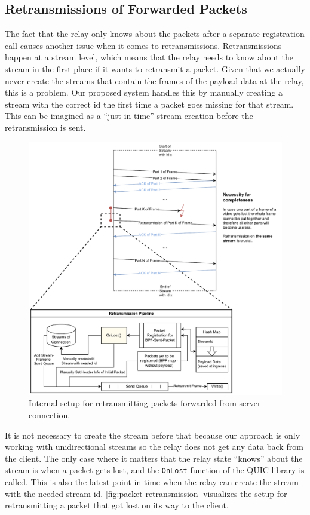 \subsection{Retransmissions of Forwarded Packets}
The fact that the relay only knows about the packets after a separate registration call causes 
another issue when it comes to retransmissions.
Retransmissions happen at a stream level, which means that the relay needs to know about the 
stream in the first place if it wants to retransmit a packet.
Given that we actually never create the streams that contain the frames of the payload data 
at the relay, this is a problem.
Our proposed system handles this by manually creating a stream with the correct id the first
time a packet goes missing for that stream.
This can be imagined as a ``just-in-time'' stream creation before the retransmission is sent.

\begin{figure}[H]
    \centering
    \includegraphics[width=\textwidth]{figures/03_fast_relays/retransmission.drawio.pdf}
    \caption[Packet retransmission schematic]{Internal setup for retransmitting packets forwarded from server connection.}\label{fig:packet-retransmission}
\end{figure}

\noindent
It is not necessary to create the stream before that because our approach is only working with 
unidirectional streams so the relay does not get any data back from the client.
The only case where it matters that the relay state ``knows'' about the stream is when a packet
gets lost, and the \verb|OnLost| function of the QUIC library is called.
This is also the latest point in time when the relay can create the stream with the needed stream-id.
\autoref{fig:packet-retransmission} visualizes the setup for retransmitting a packet that 
got lost on its way to the client. 